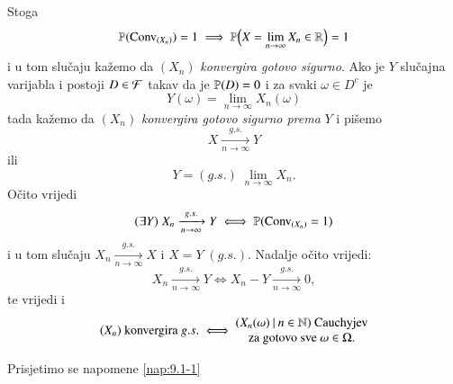 Stoga
\begin{equation}    \label{jed:11.1}
    \mathbb{P}({\mathrm{Conv}_{(X_n)}}) = 1 \implies \mathbb{P} \Big( X = \lim\limits_{n \to \infty} X_n \in \mathbb{R} \Big) = 1
\end{equation}
i u tom slu\v caju ka\v zemo da $(X_n)$ \emph{konvergira gotovo sigurno}.
Ako je $Y$ slu\v cajna varijabla i postoji $D \in \mathcal{F}$ takav da je $\mathbb{P}({D}) = 0$ i za svaki $\omega \in D^c$ je
\begin{equation*}
    Y(\omega) = \lim\limits_{n \to \infty} X_n (\omega)
\end{equation*}
tada ka\v zemo da $(X_n)$ \emph{konvergira gotovo sigurno prema} $Y$ i pi\v semo
\begin{equation*}
    X \xrightarrow[n \to \infty]{g.s.} Y
\end{equation*}
ili
\begin{equation*}
    Y = (g.s.) \; \lim\limits_{n \to \infty} X_n.
\end{equation*}
O\v cito vrijedi
\begin{equation}    \label{jed:11.2}
    (\exists Y) \; X_n \xrightarrow[n \to \infty]{g.s.} Y \iff \mathbb{P}({\mathrm{Conv}_{(X_n)} = 1})
\end{equation}
i u tom slu\v caju $X_n \xrightarrow[n \to \infty]{g.s.} X$ i $X = Y \; (g.s.)$.
Nadalje o\v cito vrijedi:
\begin{equation}    \label{jed:11.3}
    X_n \xrightarrow[n \to \infty]{g.s.} Y \iff X_n - Y \xrightarrow[n \to \infty]{g.s.} 0,
\end{equation}
te vrijedi i
\begin{equation}    \label{jed:11.4}
    (X_n) \textnormal{ konvergira } g.s.
    \iff
    \begin{matrix}
        ({X_n(\omega)} \: | \: {n \in \mathbb{N}}) \textnormal{ Cauchyjev}\\
        \textnormal{za gotovo sve } \omega \in \Omega.
    \end{matrix}
\end{equation}

Prisjetimo se napomene \ref{nap:9.1-1}

